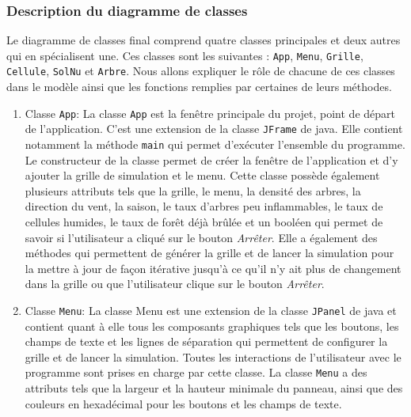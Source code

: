 
\subsubsection{Description du diagramme de classes}

Le diagramme de classes final comprend quatre classes principales et deux autres qui en spécialisent une. Ces classes sont les suivantes : \texttt{App}, \texttt{Menu}, \texttt{Grille}, \texttt{Cellule}, \texttt{SolNu} et \texttt{Arbre}. Nous allons expliquer le rôle de chacune de ces classes dans le modèle ainsi que les fonctions remplies par certaines de leurs méthodes.

\begin{enumerate}
    \item Classe \texttt{App}: La classe \texttt{App} est la fenêtre principale du projet, point de départ de l’application. C’est une extension de la classe \texttt{JFrame} de java. Elle contient notamment la méthode \texttt{main} qui permet d’exécuter l’ensemble du programme. Le constructeur de la classe permet de créer la fenêtre de l’application et d’y ajouter la grille de simulation et le menu. Cette classe possède également plusieurs attributs tels que la grille, le menu, la densité des arbres, la direction du vent, la saison, le taux d'arbres peu inflammables, le taux de cellules humides, le taux de forêt déjà brûlée et un booléen qui permet de savoir si l'utilisateur a cliqué sur le bouton \textit{Arrêter}. Elle a également des méthodes qui permettent de générer la grille et de lancer la simulation pour la mettre à jour de façon itérative jusqu’à ce qu’il n’y ait plus de changement dans la grille ou que l’utilisateur clique sur le bouton \textit{Arrêter}.\\
    
    \item Classe \texttt{Menu}: La classe Menu est une extension de la classe \texttt{JPanel} de java et contient quant à elle tous les composants graphiques tels que les boutons, les champs de texte et les lignes de séparation qui permettent de configurer la grille et de lancer la simulation. Toutes les interactions de l’utilisateur avec le programme sont prises en charge par cette classe. La classe \texttt{Menu} a des attributs tels que la largeur et la hauteur minimale du panneau, ainsi que des couleurs en hexadécimal pour les boutons et les champs de texte.\\
    

\end{enumerate}
